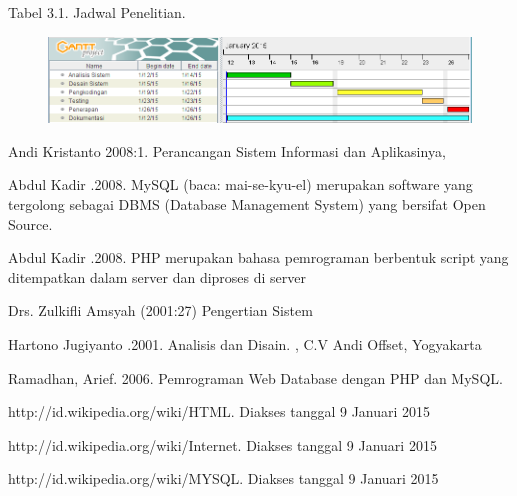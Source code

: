 \documentclass{jtetiproposalskripsi}
\begin{document}
\begin{center}
Tabel 3.1. Jadwal Penelitian.
\end{center}
\vspace{-0.5cm}
\begin{figure}[ht!]
  \centering
    \includegraphics[width=13cm]{gambar/jadwal}

\end{figure}


\begin{thebibliography}{9}

Andi Kristanto 2008:1. Perancangan Sistem Informasi dan Aplikasinya,  

Abdul Kadir .2008. MySQL (baca: mai-se-kyu-el) merupakan software yang tergolong sebagai DBMS (Database Management System) yang bersifat Open Source. 

Abdul Kadir .2008.  PHP merupakan bahasa pemrograman berbentuk script yang ditempatkan dalam server dan diproses di server 

Drs. Zulkifli Amsyah (2001:27) Pengertian Sistem  

Hartono Jugiyanto  .2001. Analisis dan Disain. , C.V Andi Offset, Yogyakarta

Ramadhan, Arief. 2006. Pemrograman Web Database dengan PHP dan MySQL.

http://id.wikipedia.org/wiki/HTML. Diakses tanggal 9 Januari 2015

http://id.wikipedia.org/wiki/Internet. Diakses tanggal 9 Januari 2015

http://id.wikipedia.org/wiki/MYSQL. Diakses tanggal 9 Januari 2015

\end{thebibliography}
\end{document}
